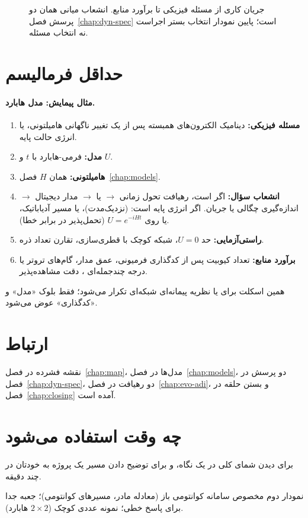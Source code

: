 \begin{figure}[htbp]
	\centering
	\begin{latin}
		\resizebox{\ifdim\width>\textwidth\textwidth\else\width\fi}{!}{%
		}
	\end{latin}
	\caption{جریان کاری از مسئله فیزیکی تا برآورد منابع. انشعاب میانی همان دو پرسش فصل~\ref{chap:dyn-spec} است؛ پایین نمودار انتخاب بستر اجراست نه انتخاب مسئله.}
	\label{fig:pipeline}
\end{figure}

\section{حداقل فرمالیسم}

\paragraph{مثال پیمایش: مدل هابارد.}
\begin{enumerate}
	\item \textbf{مسئله فیزیکی:} دینامیک الکترون‌های همبسته پس از یک تغییر ناگهانی هامیلتونی، یا انرژی حالت پایه.
	\item \textbf{مدل:} فرمی-هابارد با $t$ و $U$.
	\item \textbf{هامیلتونی:} همان $H$ فصل~\ref{chap:models}.
	\item \textbf{انشعاب سؤال:} اگر  است، رهیافت تحول زمانی $\to$  یا  $\to$ مدار دیجیتال $\to$ اندازه‌گیری چگالی یا جریان. اگر انرژی پایه است:  (نزدیک‌مدت)، یا مسیر آدیاباتیک، یا  روی $U=e^{-iHt}$ (تحمل‌پذیر در برابر خطا).
	\item \textbf{راستی‌آزمایی:} حد $U=0$، شبکه کوچک با قطری‌سازی، تقارن تعداد ذره.
	\item \textbf{برآورد منابع:} تعداد کیوبیت پس از کدگذاری فرمیونی، عمق مدار، گام‌های تروتر یا درجه چندجمله‌ای ، دقت مشاهده‌پذیر.
\end{enumerate}
همین اسکلت برای  یا نظریه پیمانه‌ای شبکه‌ای تکرار می‌شود؛ فقط بلوک «مدل» و «کدگذاری» عوض می‌شود.

\section{ارتباط}

نقشه فشرده در فصل~\ref{chap:map}، مدل‌ها در فصل~\ref{chap:models}، دو پرسش در فصل~\ref{chap:dyn-spec}، دو رهیافت در فصل~\ref{chap:evo-adi}، و بستن حلقه در فصل~\ref{chap:closing} آمده است.

\section{چه وقت استفاده می‌شود}

برای دیدن شمای کلی در یک نگاه، و برای توضیح دادن مسیر یک پروژه به خودتان در چند دقیقه.

\begin{remark}
	نمودار دوم مخصوص سامانه کوانتومی باز (معادله مادر، مسیرهای کوانتومی)؛ جعبه جدا برای پاسخ خطی؛ نمونه عددی کوچک ($2\times 2$ هابارد).
\end{remark}